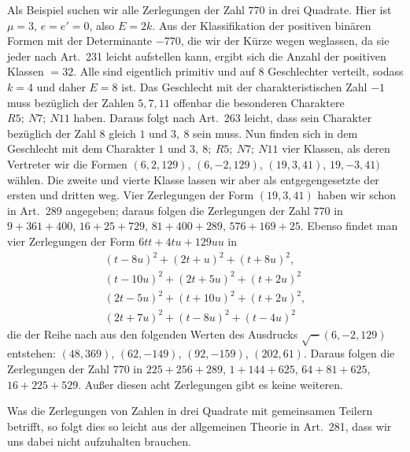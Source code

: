 Als Beispiel suchen wir alle Zerlegungen der Zahl \(770\) in drei
Quadrate. Hier ist \(\mu=3\), \(e=e'=0\), also \(E=2k\). Aus der Klassifikation
der positiven binären Formen mit der Determinante \(-770\), die
wir der Kürze wegen weglassen, da sie jeder nach Art.\ 231 leicht
aufstellen kann, ergibt sich die Anzahl der positiven Klassen
\(=32\). Alle sind eigentlich primitiv und auf \(8\) Geschlechter
verteilt, sodass \(k=4\) und daher \(E=8\) ist. Das Geschlecht mit
der charakteristischen Zahl \(-1\) muss bezüglich der Zahlen
\(5,7,11\) offenbar die besonderen Charaktere \(R5;\ N7;\ N11\) haben. Daraus
folgt nach Art.\ 263 leicht, dass sein Charakter bezüglich der
Zahl \(8\) gleich \(1\text{ und }3,\ 8\) sein muss. Nun finden sich in dem
Geschlecht mit dem Charakter \(1\text{ und }3,\ 8;\ R5;\ N7;\ N11\) vier Klassen, als deren Vertreter
wir die Formen \((6,2,129)\), \((6,-2,129)\), \((19,3,41)\), \(19,-3,41)\) wählen. Die
zweite und vierte Klasse lassen wir aber als entgegengesetzte der
ersten und dritten weg. Vier Zerlegungen der Form \((19,3,41)\) haben
wir schon in Art.\ 289 angegeben; daraus folgen die Zerlegungen
der Zahl \(770\) in \(9+361+400\), \(16+25+729\), \(81+400+289\), \(576+169+25\). Ebenso
findet man vier Zerlegungen der Form \(6tt+4tu+129uu\) in
\[
\begin{gathered}
(t-8u)^2+(2t+u)^2+(t+8u)^2,\\
(t-10u)^2+(2t+5u)^2+(t+2u)^2\\
(2t-5u)^2+(t+10u)^2+(t+2u)^2,\\
(2t+7u)^2+(t-8u)^2+(t-4u)^2
\end{gathered}
\]
die der Reihe nach aus den folgenden Werten des Ausdrucks \(\surd-(6,-2,129)\)
entstehen: \((48,369)\), \((62,-149)\), \((92,-159)\), \((202,61)\). Daraus folgen
die Zerlegungen der Zahl \(770\) in \(225+256+289\), \(1+144+625\), \(64+81+625\),
\(16+225+529\). Außer diesen acht Zerlegungen gibt es keine weiteren.

Was die Zerlegungen von Zahlen in drei Quadrate mit gemeinsamen
Teilern betrifft, so folgt dies so leicht aus der allgemeinen Theorie
in Art.\ 281, dass wir uns dabei nicht aufzuhalten brauchen.

